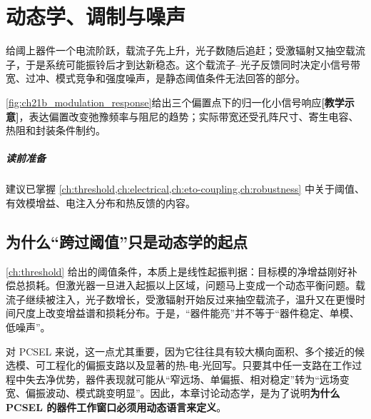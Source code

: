 ﻿%
\chapter{动态学、调制与噪声}
\label{ch:dynamics}

给阈上器件一个电流阶跃，载流子先上升，光子数随后追赶；受激辐射又抽空载流子，于是系统可能振铃后才到达新稳态。这个载流子--光子反馈同时决定小信号带宽、过冲、模式竞争和强度噪声，是静态阈值条件无法回答的部分。

\cref{fig:ch21b_modulation_response}给出三个偏置点下的归一化小信号响应\textbf{[教学示意]}，表达偏置改变弛豫频率与阻尼的趋势；实际带宽还受孔阵尺寸、寄生电容、热阻和封装条件制约\cite{coldren2012,itoh2020}。



\paragraph{读前准备}
建议已掌握 \cref{ch:threshold,ch:electrical,ch:eto-coupling,ch:robustness} 中关于阈值、有效模增益、电注入分布和热反馈的内容。

\section{为什么“跨过阈值”只是动态学的起点}
\cref{ch:threshold} 给出的阈值条件，本质上是线性起振判据：目标模的净增益刚好补偿总损耗。但激光器一旦进入起振以上区域，问题马上变成一个动态平衡问题。载流子继续被注入，光子数增长，受激辐射开始反过来抽空载流子，温升又在更慢时间尺度上改变增益谱和损耗分布。于是，“器件能亮”并不等于“器件稳定、单模、低噪声”。

对 PCSEL 来说，这一点尤其重要，因为它往往具有较大横向面积、多个接近的候选模、可工程化的偏振支路以及显著的热-电-光回写。只要其中任一支路在工作过程中失去净优势，器件表现就可能从“窄远场、单偏振、相对稳定”转为“远场变宽、偏振波动、模式跳变明显”。因此，本章讨论动态学，是为了说明\textbf{为什么 PCSEL 的器件工作窗口必须用动态语言来定义}。

